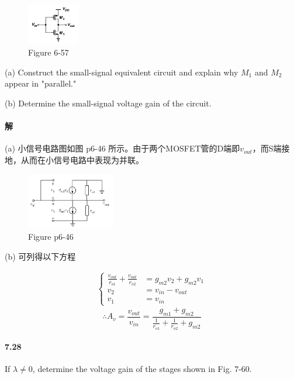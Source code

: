 \documentclass[hyperref, UTF8]{ctexart}
\begin{document}
    \begin{figure}[!htb]
        \centering
        \includegraphics[width=0.203\textwidth]{p6-57.png}
        \caption*{Figure 6-57}
    \end{figure}    

    (a) Construct the small-signal equivalent circuit and explain why $M_1$ and $M_2$ appear in "parallel."

    (b) Determine the small-signal voltage gain of the circuit.

\paragraph{解}

    (a) 小信号电路图如图 p6-46 所示。由于两个MOSFET管的D端即$v_{out}$，而S端接地，从而在小信号电路中表现为并联。

    \begin{figure}[!htb]
        \centering
        \includegraphics[width=0.343\textwidth]{p6-46-sol.png}
        \caption*{Figure p6-46}
    \end{figure}
    
    (b) 可列得以下方程

    \begin{gather*}
        \left\{ \begin{aligned}
            \frac{v_{out}}{r_{o1}}+\frac{v_{out}}{r_{o2}} & = g_{m2}v_2 + g_{m2}v_1 \\
            v_2 & = v_{in}-v_{out} \\
            v_1 & = v_{in}
        \end{aligned} \right.
    \end{gather*}
    $$\therefore A_v = \frac{v_{out}}{v_{in}} = \frac{g_{m1}+g_{m2}}{\frac{1}{r_{o1}}+\frac{1}{r_{o2}}+g_{m2}}$$

\paragraph{7.28} \label{7.28}
    If $\lambda \neq 0$, determine the voltage gain of the stages shown in Fig. 7-60. 
\end{document}
